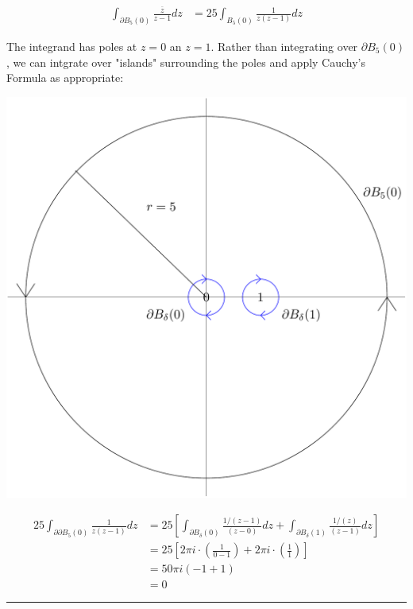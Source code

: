\documentclass{article}
\begin{document}
\begin{align*}
  \int_{\partial B_5(0)} \frac{\overline{z}}{z-1} dz &= 25 \int_{B_5(0)} \frac{1}{z(z-1)} dz 
\end{align*}

\vskip 0.5cm
The integrand has poles at $z = 0$ an $z = 1$. Rather than integrating over $\partial B_5(0)$, we can intgrate over "islands" surrounding the poles and apply Cauchy's Formula as appropriate:

\begin{center}
  \includegraphics[scale=0.25]{Q6 HW 3.png}
\end{center}

\begin{align*}
  25 \int_{\partial \partial B_5(0)} \frac{1}{z(z-1)} dz &= 25 \left[ \int_{\partial B_{\delta}(0)} \frac{1/(z-1)}{\left(z - 0\right)} dz + \int_{\partial B_{\delta}(1)} \frac{1/(z)}{\left(z - 1\right)} dz \right] \\
  &= 25 \left[ 2\pi i \cdot \left( \frac{1}{0-1} \right) + 2\pi i \cdot \left( \frac{1}{1} \right) \right] \\
  &= 50 \pi i \left( -1 + 1 \right) \\
  &= 0
\end{align*}

\vskip 0.5cm
\hrule 
\vskip 0.5cm
\end{document}
